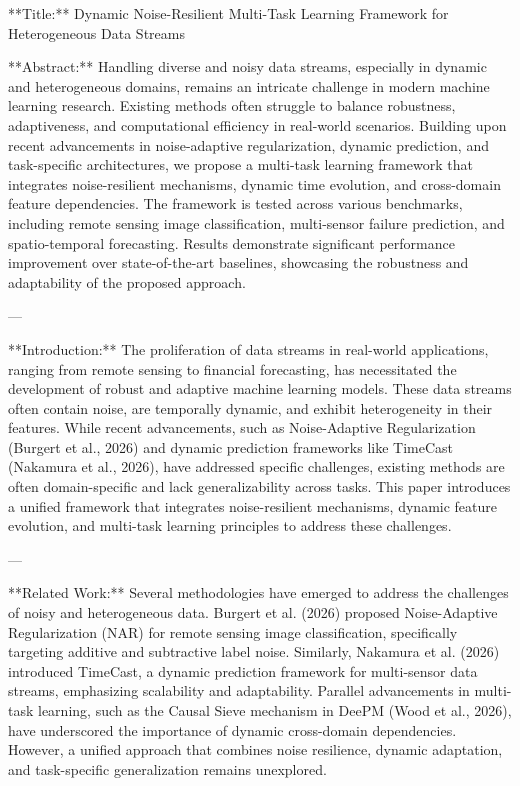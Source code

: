 **Title:**  
Dynamic Noise-Resilient Multi-Task Learning Framework for Heterogeneous Data Streams  

**Abstract:**  
Handling diverse and noisy data streams, especially in dynamic and heterogeneous domains, remains an intricate challenge in modern machine learning research. Existing methods often struggle to balance robustness, adaptiveness, and computational efficiency in real-world scenarios. Building upon recent advancements in noise-adaptive regularization, dynamic prediction, and task-specific architectures, we propose a multi-task learning framework that integrates noise-resilient mechanisms, dynamic time evolution, and cross-domain feature dependencies. The framework is tested across various benchmarks, including remote sensing image classification, multi-sensor failure prediction, and spatio-temporal forecasting. Results demonstrate significant performance improvement over state-of-the-art baselines, showcasing the robustness and adaptability of the proposed approach.  

---

**Introduction:**  
The proliferation of data streams in real-world applications, ranging from remote sensing to financial forecasting, has necessitated the development of robust and adaptive machine learning models. These data streams often contain noise, are temporally dynamic, and exhibit heterogeneity in their features. While recent advancements, such as Noise-Adaptive Regularization (Burgert et al., 2026) and dynamic prediction frameworks like TimeCast (Nakamura et al., 2026), have addressed specific challenges, existing methods are often domain-specific and lack generalizability across tasks. This paper introduces a unified framework that integrates noise-resilient mechanisms, dynamic feature evolution, and multi-task learning principles to address these challenges.  

---

**Related Work:**  
Several methodologies have emerged to address the challenges of noisy and heterogeneous data. Burgert et al. (2026) proposed Noise-Adaptive Regularization (NAR) for remote sensing image classification, specifically targeting additive and subtractive label noise. Similarly, Nakamura et al. (2026) introduced TimeCast, a dynamic prediction framework for multi-sensor data streams, emphasizing scalability and adaptability. Parallel advancements in multi-task learning, such as the Causal Sieve mechanism in DeePM (Wood et al., 2026), have underscored the importance of dynamic cross-domain dependencies. However, a unified approach that combines noise resilience, dynamic adaptation, and task-specific generalization remains unexplored.  

